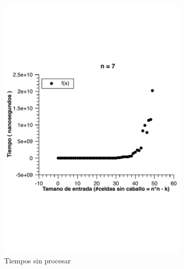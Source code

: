 \begin{figure}[H]
        \centering
        \begin{subfigure}[b]{0.5\textwidth}
                \includegraphics[width=\textwidth]{imagenes/grafico3-n-7-norm.pdf}
                \caption{Tiempos sin procesar}
        \end{subfigure}%
        ~ %
        \begin{subfigure}[b]{0.5\textwidth}

\end{subfigure}
\end{figure}
